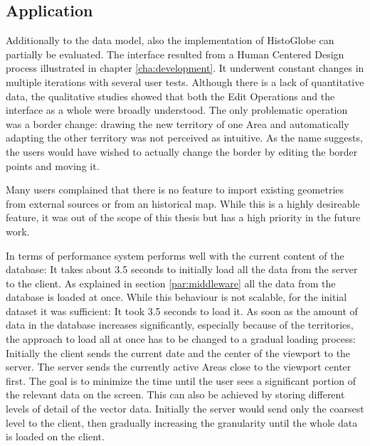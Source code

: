 
\subsection{Application} %
\label{sub:application}

Additionally to the data model, also the implementation of HistoGlobe can partially be evaluated. The interface resulted from a Human Centered Design process illustrated in chapter \ref{cha:development}. It underwent constant changes in multiple iterations with several user tests. Although there is a lack of quantitative data, the qualitative studies showed that both the Edit Operations and the interface as a whole were broadly understood. The only problematic operation was a border change: drawing the new territory of one Area and automatically adapting the other territory was not perceived as intuitive. As the name suggests, the users would have wished to actually change the border by editing the border points and moving it.

Many users complained that there is no feature to import existing geometries from external sources or from an historical map. While this is a highly desireable feature, it was out of the scope of this thesis but has a high priority in the future work.

In terms of performance system performs well with the current content of the database: It takes about 3.5 seconds to initially load all the data from the server to the client. As explained in section \ref{par:middleware}  all the data from the database is loaded at once. While this behaviour is not scalable, for the initial dataset it was sufficient: It took 3.5 seconds to load it. As soon as the amount of data in the database increases significantly, especially because of the territories, the approach to load all at once has to be changed to a gradual loading process: Initially the client sends the current date and the center of the viewport to the server. The server sends the currently active Areas close to the viewport center first. The goal is to minimize the time until the user sees a significant portion of the relevant data on the screen. This can also be achieved by storing different levels of detail of the vector data. Initially the server would send only the coarsest level to the client, then gradually increasing the granularity until the whole data is loaded on the client.

